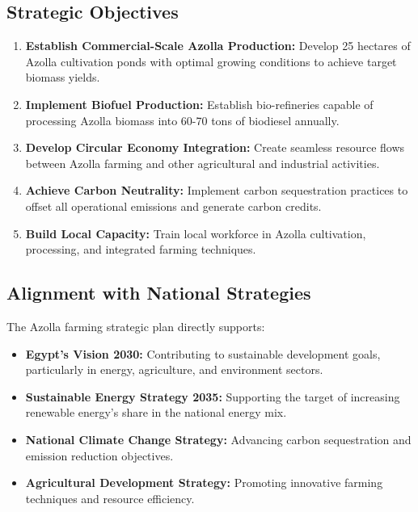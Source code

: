 \subsection{Strategic Objectives}

\begin{enumerate}
    \item \textbf{Establish Commercial-Scale Azolla Production:} Develop 25 hectares of Azolla cultivation ponds with optimal growing conditions to achieve target biomass yields.
    
    \item \textbf{Implement Biofuel Production:} Establish bio-refineries capable of processing Azolla biomass into 60-70 tons of biodiesel annually.
    
    \item \textbf{Develop Circular Economy Integration:} Create seamless resource flows between Azolla farming and other agricultural and industrial activities.
    
    \item \textbf{Achieve Carbon Neutrality:} Implement carbon sequestration practices to offset all operational emissions and generate carbon credits.
    
    \item \textbf{Build Local Capacity:} Train local workforce in Azolla cultivation, processing, and integrated farming techniques.
\end{enumerate}

\subsection{Alignment with National Strategies}

The Azolla farming strategic plan directly supports:

\begin{itemize}
    \item \textbf{Egypt's Vision 2030:} Contributing to sustainable development goals, particularly in energy, agriculture, and environment sectors.
    
    \item \textbf{Sustainable Energy Strategy 2035:} Supporting the target of increasing renewable energy's share in the national energy mix.
    
    \item \textbf{National Climate Change Strategy:} Advancing carbon sequestration and emission reduction objectives.
    
    \item \textbf{Agricultural Development Strategy:} Promoting innovative farming techniques and resource efficiency.
\end{itemize}

